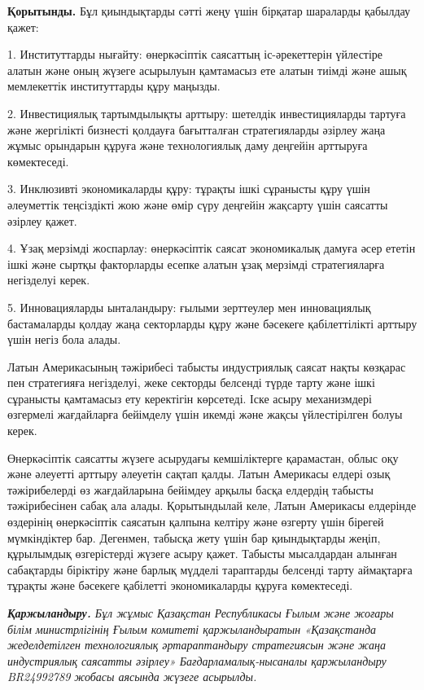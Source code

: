 \begin{multicols}{2}
{\bfseries Қорытынды.} Бұл қиындықтарды сәтті жеңу үшін бірқатар шараларды
қабылдау қажет:

1. Институттарды нығайту: өнеркәсіптік саясаттың іс-әрекеттерін
үйлестіре алатын және оның жүзеге асырылуын қамтамасыз ете алатын тиімді
және ашық мемлекеттік институттарды құру маңызды.

2. Инвестициялық тартымдылықты арттыру: шетелдік инвестицияларды тартуға
және жергілікті бизнесті қолдауға бағытталған стратегияларды әзірлеу
жаңа жұмыс орындарын құруға және технологиялық даму деңгейін арттыруға
көмектеседі.

3. Инклюзивті экономикаларды құру: тұрақты ішкі сұранысты құру үшін
әлеуметтік теңсіздікті жою және өмір сүру деңгейін жақсарту үшін
саясатты әзірлеу қажет.

4. Ұзақ мерзімді жоспарлау: өнеркәсіптік саясат экономикалық дамуға әсер
ететін ішкі және сыртқы факторларды есепке алатын ұзақ мерзімді
стратегияларға негізделуі керек.

5. Инновацияларды ынталандыру: ғылыми зерттеулер мен инновациялық
бастамаларды қолдау жаңа секторларды құру және бәсекеге қабілеттілікті
арттыру үшін негіз бола алады.

Латын Америкасының тәжірибесі табысты индустриялық саясат нақты көзқарас
пен стратегияға негізделуі, жеке секторды белсенді түрде тарту және ішкі
сұранысты қамтамасыз ету керектігін көрсетеді. Іске асыру механизмдері
өзгермелі жағдайларға бейімделу үшін икемді және жақсы үйлестірілген
болуы керек.

Өнеркәсіптік саясатты жүзеге асырудағы кемшіліктерге қарамастан, облыс
оқу және әлеуетті арттыру әлеуетін сақтап қалды. Латын Америкасы елдері
озық тәжірибелерді өз жағдайларына бейімдеу арқылы басқа елдердің
табысты тәжірибесінен сабақ ала алады. Қорытындылай келе, Латын
Америкасы елдерінде өздерінің өнеркәсіптік саясатын қалпына келтіру және
өзгерту үшін бірегей мүмкіндіктер бар. Дегенмен, табысқа жету үшін бар
қиындықтарды жеңіп, құрылымдық өзгерістерді жүзеге асыру қажет. Табысты
мысалдардан алынған сабақтарды біріктіру және барлық мүдделі тараптарды
белсенді тарту аймақтарға тұрақты және бәсекеге қабілетті экономикаларды
құруға көмектеседі.

\emph{{\bfseries Қаржыландыру.} Бұл жұмыс Қазақстан Республикасы Ғылым және
жоғары білім министрлігінің Ғылым комитеті қаржыландыратын «Қазақстанда
жеделдетілген технологиялық әртараптандыру стратегиясын және жаңа
индустриялық саясатты әзірлеу» Бағдарламалық-нысаналы қаржыландыру
BR24992789 жобасы аясында жүзеге асырылды.}
\end{multicols}

